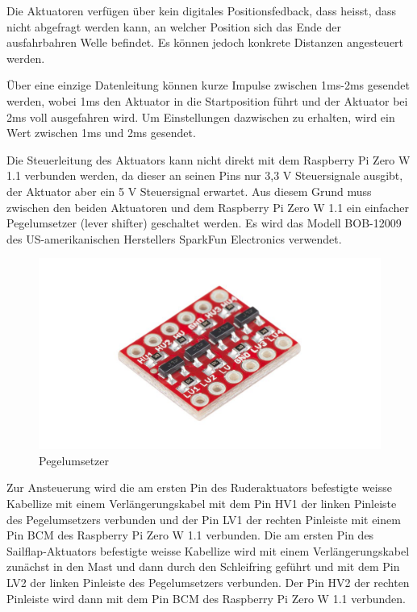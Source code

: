 Die Aktuatoren verfügen über kein digitales Positionsfedback, dass heisst, dass nicht abgefragt werden kann, an welcher Position sich das Ende der ausfahrbahren Welle befindet. Es können jedoch konkrete Distanzen angesteuert werden. 

Über eine einzige Datenleitung können kurze Impulse zwischen 1ms-2ms gesendet werden, wobei 1ms den Aktuator in die Startposition führt und der Aktuator bei 2ms voll ausgefahren wird. Um Einstellungen dazwischen zu erhalten, wird ein Wert zwischen 1ms und 2ms gesendet. 

Die Steuerleitung des Aktuators kann nicht direkt mit dem Raspberry Pi Zero W 1.1 verbunden werden, da dieser an seinen Pins nur 3,3 V Steuersignale ausgibt, der Aktuator aber ein 5 V Steuersignal erwartet. Aus diesem Grund muss zwischen den beiden Aktuatoren und dem Raspberry Pi Zero W 1.1 ein einfacher Pegelumsetzer (lever shifter) geschaltet werden. Es wird das Modell  BOB-12009 des US-amerikanischen Herstellers SparkFun Electronics verwendet.
\begin{figure} [H]
    \includegraphics[width=1\linewidth]{assets/Sparkfun-BOB-12009-30145425-01.jpg}
    \caption{Pegelumsetzer}
    \label{fig:enter-label}
\end{figure}
Zur Ansteuerung wird die am ersten Pin des Ruderaktuators befestigte weisse Kabellize mit einem Verlängerungskabel mit dem Pin HV1 der linken Pinleiste des Pegelumsetzers verbunden und der Pin LV1 der rechten Pinleiste mit einem Pin BCM des Raspberry Pi Zero W 1.1 verbunden. Die am ersten Pin des Sailflap-Aktuators befestigte weisse Kabellize wird mit einem Verlängerungskabel zunächst in den Mast und dann durch den Schleifring geführt und mit dem Pin LV2 der linken Pinleiste des Pegelumsetzers verbunden. Der Pin HV2 der rechten Pinleiste wird dann mit dem Pin BCM des Raspberry Pi Zero W 1.1 verbunden.
